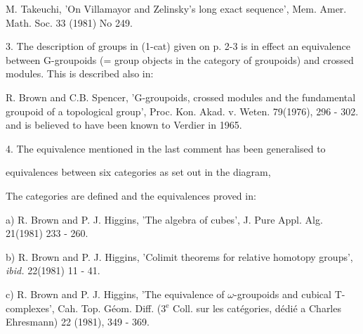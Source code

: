 \documentclass[11pt]{article}
\newcommand{\scanpage}[1]{\par\bigskip\noindent{\small\sffamily[scan #1]}\par}
\newcommand{\mspage}[1]{{\small\sffamily[p.\,#1]}}
\newenvironment{diagramblock}{\par\begin{center}}{\end{center}\par}
\begin{document}
M. Takeuchi, 'On Villamayor and Zelinsky's long exact sequence',
Mem. Amer. Math. Soc. 33 (1981) No 249.

3. The description of groups in (1-cat) given on p. 2-3 is in effect an
equivalence between G-groupoids (= group objects in the category of
groupoids) and crossed modules. This is described also in:

R. Brown and C.B. Spencer, 'G-groupoids, crossed modules and the
fundamental groupoid of a topological group', Proc. Kon. Akad.
v. Weten. 79(1976), 296 - 302.
and is believed to have been known to Verdier in 1965.

4. The equivalence mentioned in the last comment has been generalised to

\mspage{118}

\clearpage
\scanpage{134-2/118}
\mspage{-2-}

equivalences between six categories as set out in the diagram,

\begin{diagramblock}\end{diagramblock}

The categories are defined and the equivalences proved in:

a) R. Brown and P. J. Higgins, 'The algebra of cubes',
J. Pure Appl. Alg. 21(1981) 233 - 260.

b) R. Brown and P. J. Higgins, 'Colimit theorems for relative
homotopy groups', \textit{ibid.} 22(1981) 11 - 41.

c) R. Brown and P. J. Higgins, 'The equivalence of $\omega$-groupoids and
cubical T-complexes', Cah. Top. Géom. Diff. (3$^{\text{e}}$ Coll. sur les
catégories, dédié a Charles Ehresmann) 22 (1981), 349 - 369.
\end{document}

